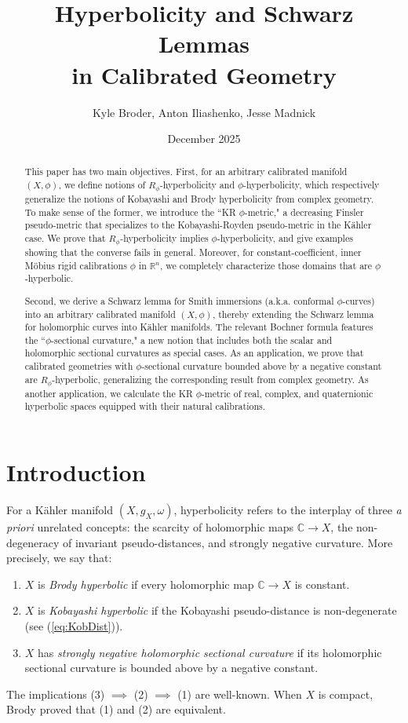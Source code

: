 \documentclass[11pt]{article}
\title{Hyperbolicity and Schwarz Lemmas \\
in Calibrated Geometry}
\author{Kyle Broder, Anton Iliashenko, Jesse Madnick}
\date{December 2025}
\newcommand{\R}{\mathbb{R}}
\newcommand{\C}{\mathbb{C}}
\theoremstyle{definition}
\numberwithin{equation}{section}
\begin{document}
\maketitle

	\begin{abstract} This paper has two main objectives.  First, for an arbitrary calibrated manifold $(X,\phi)$, we define notions of $R_\phi$-hyperbolicity and $\phi$-hyperbolicity, which respectively generalize the notions of Kobayashi and Brody hyperbolicity from complex geometry.  To make sense of the former, we introduce the ``KR $\phi$-metric," a decreasing Finsler pseudo-metric that specializes to the Kobayashi-Royden pseudo-metric in the K\"{a}hler case.  We prove that $R_\phi$-hyperbolicity implies $\phi$-hyperbolicity, and give examples showing that the converse fails in general.  Moreover, for constant-coefficient, inner M\"{o}bius rigid calibrations $\phi$ in $\R^n$, we completely characterize those domains that are $\phi$-hyperbolic.

Second, we derive a Schwarz lemma for Smith immersions (a.k.a. conformal $\phi$-curves) into an arbitrary calibrated manifold $(X, \phi)$, thereby extending the Schwarz lemma for holomorphic curves into K\"{a}hler manifolds.  The relevant Bochner formula features the ``$\phi$-sectional curvature," a new notion that includes both the scalar and holomorphic sectional curvatures as special cases.  As an application, we prove that calibrated geometries with $\phi$-sectional curvature bounded above by a negative constant are $R_\phi$-hyperbolic, generalizing the corresponding result from complex geometry.  As another application, we calculate the KR $\phi$-metric of real, complex, and quaternionic hyperbolic spaces equipped with their natural calibrations.
\end{abstract}

  \tableofcontents

\pagebreak

\section{Introduction}

\indent \indent For a K\"{a}hler manifold $(X, g_X, \omega)$, hyperbolicity refers to the interplay of three \emph{a priori} unrelated concepts: the scarcity of holomorphic maps $\C \to X$, the non-degeneracy of invariant pseudo-distances, and strongly negative curvature.  More precisely, we say that:
\begin{enumerate}[(1)]
\item $X$ is \emph{Brody hyperbolic} if every holomorphic map $\C \to X$ is constant.
\item $X$ is \emph{Kobayashi hyperbolic} if the Kobayashi pseudo-distance is non-degenerate (see (\ref{eq:KobDist})).
\item $X$ has \emph{strongly negative holomorphic sectional curvature} if its holomorphic sectional curvature is bounded above by a negative constant.
\end{enumerate}
The implications (3) $\implies$ (2) $\implies$ (1) are well-known.  When $X$ is compact, Brody \cite{brody1978compact} proved that (1) and (2) are equivalent. 
\end{document}
